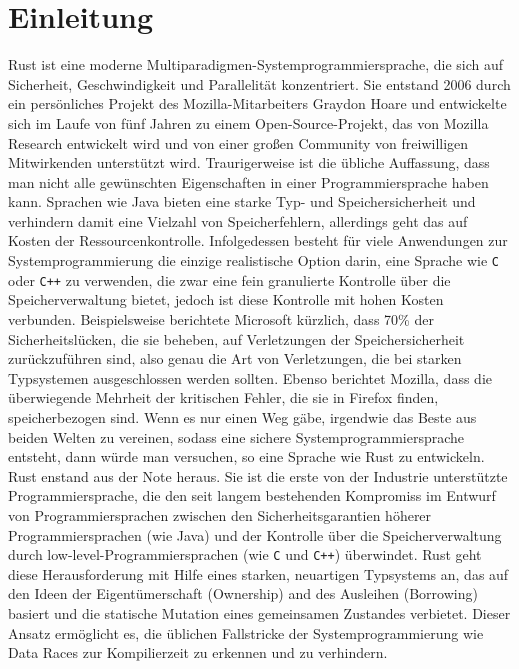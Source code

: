 
\chapter{Einleitung}

\nocite{*}
Rust ist eine moderne Multiparadigmen-Systemprogrammiersprache, die sich auf Sicherheit, Geschwindigkeit und Parallelität konzentriert. Sie entstand 2006 durch ein persönliches Projekt des Mozilla-Mitarbeiters Graydon Hoare und entwickelte sich im Laufe von fünf Jahren zu einem Open-Source-Projekt, das von Mozilla Research entwickelt wird und von einer großen Community von freiwilligen Mitwirkenden unterstützt wird. Traurigerweise ist die übliche Auffassung, dass man nicht alle gewünschten Eigenschaften in einer Programmiersprache haben kann. Sprachen wie Java bieten eine starke Typ- und Speichersicherheit und verhindern damit eine Vielzahl von Speicherfehlern, allerdings geht das auf Kosten der Ressourcenkontrolle. Infolgedessen besteht für viele Anwendungen zur Systemprogrammierung die einzige realistische Option darin, eine Sprache wie \texttt{C} oder \texttt{C++} zu verwenden, die zwar eine fein granulierte Kontrolle über die Speicherverwaltung bietet, jedoch ist diese Kontrolle mit hohen Kosten verbunden. Beispielsweise berichtete Microsoft kürzlich, dass 70\% der Sicherheitslücken, die sie beheben, auf Verletzungen der Speichersicherheit zurückzuführen sind, also genau die Art von Verletzungen, die bei starken Typsystemen ausgeschlossen werden sollten. Ebenso berichtet Mozilla, dass die überwiegende Mehrheit der kritischen Fehler, die sie in Firefox finden, speicherbezogen sind. Wenn es nur einen Weg gäbe, irgendwie das Beste aus beiden Welten zu vereinen, sodass eine sichere Systemprogrammiersprache entsteht, dann würde man versuchen, so eine Sprache wie Rust zu entwickeln. Rust enstand aus der Note heraus. Sie ist die erste von der Industrie unterstützte Programmiersprache, die den seit langem bestehenden Kompromiss im Entwurf von Programmiersprachen zwischen den Sicherheitsgarantien höherer Programmiersprachen (wie Java) und der Kontrolle über die Speicherverwaltung durch low-level-Programmiersprachen (wie \texttt{C} und \texttt{C++}) überwindet. Rust geht diese Herausforderung mit Hilfe eines starken, neuartigen Typsystems an, das auf den Ideen der Eigentümerschaft (Ownership) and des Ausleihen (Borrowing) basiert und die statische Mutation eines gemeinsamen Zustandes verbietet. Dieser Ansatz ermöglicht es, die üblichen Fallstricke der Systemprogrammierung wie Data Races zur Kompilierzeit zu erkennen und zu verhindern. 

